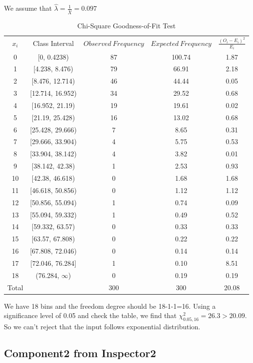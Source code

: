 \documentclass{article}
\begin{document}
We assume that $\hat{\lambda}=\frac{1}{\bar{X}}=0.097$
\begin{table}[htp]
\caption{Chi-Square Goodness-of-Fit Test}
\begin{center}
\begin{tabular}{ccccc}
\hline
$x_i$ & Class Interval & $Observed\ Frequency$ & $Expected\ Frequency$ & $\frac{(O_i-E_i)^2}{E_i}$\\
0& [0, 0.4238)&87&100.74&1.87\\
1& [4.238, 8.476)&79&66.91&2.18\\
2&[8.476, 12.714)&46&44.44&0.05\\
3& [12.714, 16.952)&34&29.52&0.68\\
4&[16.952, 21.19)&19&19.61&0.02\\
5& [21.19, 25.428)&16&13.02&0.68\\
6& [25.428, 29.666)&7&8.65&0.31\\
7& [29.666, 33.904)&4&5.75&0.53\\
8& [33.904, 38.142)&4&3.82&0.01\\
9& [38.142, 42.38)&1&2.53&0.93\\
10&[42.38, 46.618)&0&1.68&1.68\\
11&[46.618, 50.856)&0&1.12&1.12\\
12& [50.856, 55.094)&1&0.74&0.09\\
13& [55.094, 59.332)&1&0.49&0.52\\
14& [59.332, 63.57)&0&0.33&0.33\\
15& [63.57, 67.808)&0&0.22&0.22\\
16& [67.808, 72.046)&0&0.14&0.14\\
17& [72.046, 76.284]&1&0.10&8.51\\
18& (76.284, $\infty$)&0&0.19&0.19\\
\hline
Total& &300&300&20.08\\

\hline

\end{tabular}
\end{center}
\label{default}
\end{table}%

We have 18 bins and the freedom degree should be 18-1-1=16. Using a significance level of 0.05 and check the table, we find that $\chi^2_{0.05, 16}=26.3 > 20.09$. So we can't reject that the input follows exponential distribution.

\subsection{Component2 from Inspector2}
\end{document}

